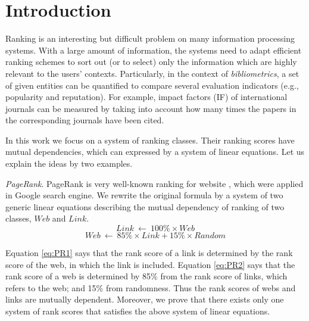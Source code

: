 \documentclass[10pt,leqno,twoside]{article}
\begin{document}
\section{Introduction}
Ranking is an interesting but difficult problem on many information processing systems. With a large amount of information, the systems need to adapt efficient ranking schemes to sort out (or to select) only the information which are highly relevant to the users' contexts.
Particularly, in the context of \emph{bibliometrics}, %
a set of given entities can be quantified to compare several evaluation indicators (e.g., popularity and reputation). For example, impact factors (IF) of international journals can be measured by taking into account how many times the papers in the corresponding journals have been cited.

In this work we focus on a system of ranking classes. Their ranking scores have mutual dependencies, which can expressed by a system of linear equations. Let us explain the ideas by two examples.

\textit{PageRank}. PageRank is very well-known ranking for website \cite{pagerank98}, which were applied in Google search engine. We rewrite the original formula by a system of two generic linear equations describing the mutual dependency of ranking of two classes, $Web$ and $Link$.
{\small
\begin{equation}\label{eq:PR1}
Link ~\longleftarrow~ 100\% \times Web
\end{equation}
\begin{equation}\label{eq:PR2}
Web ~\longleftarrow~ 85\% \times Link + 15\%\times Random
\end{equation}
}

Equation \ref{eq:PR1} says that the rank score of a link is determined by the rank score of the web, in which the link is included. Equation \ref{eq:PR2} says that the rank score of a web is determined  by 85\% from the rank score of links, which refers to the web; and 15\% from randomness. Thus the rank scores of webs and links are mutually dependent. Moreover, we prove that there exists only one system of rank scores that satisfies the above system of linear equations.
\end{document}
